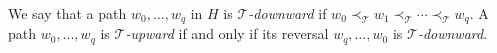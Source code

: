 \documentclass[kpfonts]{patmorin}
\theoremstyle{named}
\begin{document}
We say that a path $w_0,\ldots,w_q$ in $H$ is \emph{$\mathcal{T}$-downward} if $w_0\prec_\mathcal{T}w_{1}\prec_\mathcal{T}\cdots\prec_\mathcal{T} w_q$.  A path $w_0,\ldots,w_q$ is \emph{$\mathcal{T}$-upward} if and only if its reversal $w_q,\ldots,w_0$ is \emph{$\mathcal{T}$-downward}.
%
%
%
%
\end{document}
